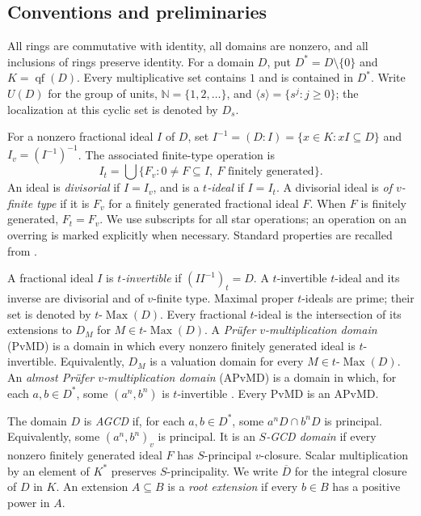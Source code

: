 \documentclass[11pt]{amsart}
\theoremstyle{definition}
\theoremstyle{remark}
\DeclareMathOperator{\qf}{qf}
\newcommand{\NN}{\mathbb N}
\newcommand{\tMax}{t\text{-}\operatorname{Max}}
\begin{document}
\subsection{Conventions and preliminaries}

All rings are commutative with identity, all domains are nonzero, and
all inclusions of rings preserve identity. For a domain $D$, put
$D^\ast=D\setminus\{0\}$ and $K=\qf(D)$. Every multiplicative set
contains $1$ and is contained in $D^\ast$. Write $U(D)$ for the
group of units, $\NN=\{1,2,\ldots\}$, and
$\langle s\rangle=\{s^j:j\geq0\}$; the localization at this cyclic
set is denoted by $D_s$.

For a nonzero fractional ideal $I$ of $D$, set
$I^{-1}=(D:I)=\{x\in K:xI\subseteq D\}$ and $I_v=(I^{-1})^{-1}$.
The associated finite-type operation is
\[
 I_t=\bigcup\{F_v:0\ne F\subseteq I,\ F\text{ finitely generated}\}.
\]
An ideal is \emph{divisorial} if $I=I_v$, and is a \emph{$t$-ideal}
if $I=I_t$. A divisorial ideal is \emph{of $v$-finite type} if it is
$F_v$ for a finitely generated fractional ideal $F$. When $F$ is
finitely generated, $F_t=F_v$. We use subscripts for all star operations;
an operation on an overring is marked explicitly when necessary.
Standard properties are recalled from \cite{Alain, Gilmer}.

A fractional ideal $I$ is \emph{$t$-invertible} if $(II^{-1})_t=D$.
A $t$-invertible $t$-ideal and its inverse are divisorial and of
$v$-finite type. Maximal proper $t$-ideals are prime; their set is
denoted by $\tMax(D)$. Every fractional $t$-ideal is the intersection
of its extensions to $D_M$ for $M\in\tMax(D)$.
A \emph{Pr\"ufer $v$-multiplication domain} (PvMD) is a domain in which
every nonzero finitely generated ideal is $t$-invertible.
Equivalently, $D_M$ is a valuation domain for every $M\in\tMax(D)$.
An \emph{almost Pr\"ufer $v$-multiplication domain} (APvMD) is a domain
in which, for each $a,b\in D^\ast$, some $(a^n,b^n)$ is $t$-invertible
\cite{LiAPvMD}. Every PvMD is an APvMD.

The domain $D$ is \emph{AGCD} if, for each $a,b\in D^\ast$, some
$a^nD\cap b^nD$ is principal. Equivalently, some $(a^n,b^n)_v$ is
principal. It is an \emph{$S$-GCD domain} if every nonzero finitely
generated ideal $F$ has $S$-principal $v$-closure. Scalar multiplication
by an element of $K^\ast$ preserves $S$-principality.
We write $\overline D$ for the integral closure of $D$ in $K$.
An extension $A\subseteq B$ is a \emph{root extension} if every
$b\in B$ has a positive power in $A$.
\end{document}

